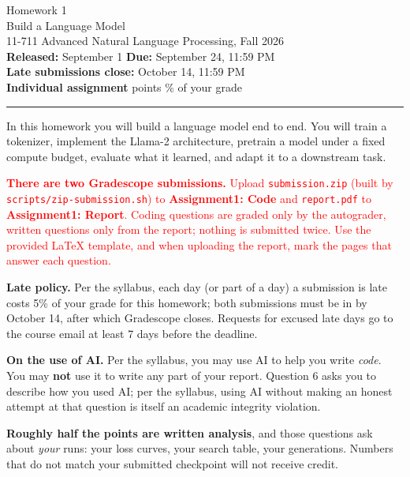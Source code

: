 \documentclass[11pt]{article}
\begin{document}
\begin{center}
  {\Huge\sffamily\color{mauve} Homework 1}\\[6pt]
  {\Large\sffamily Build a Language Model}\\[10pt]
  {\large 11-711 Advanced Natural Language Processing, Fall 2026}\\[4pt]
  \textbf{Released:} September 1 \quad\textbf{Due:} September 24, 11:59 PM\\[2pt]
  \textbf{Late submissions close:} October 14, 11:59 PM\\[2pt]
  \textbf{Individual assignment}  points \% of your grade
\end{center}

\vspace{0.8em}
\hrule
\vspace{0.8em}

\noindent In this homework you will build a language model end to end. You will train a
tokenizer, implement the Llama-2 architecture, pretrain a model under a fixed compute budget,
evaluate what it learned, and adapt it to a downstream task.

\vspace{0.6em}
\noindent\textcolor{red}{\textbf{There are two Gradescope submissions.} Upload
\texttt{submission.zip} (built by \texttt{scripts/zip-submission.sh}) to \textbf{Assignment1: Code}
and \texttt{report.pdf} to \textbf{Assignment1: Report}. Coding questions are graded only by the
autograder, written questions only from the report; nothing is submitted twice. Use the provided
LaTeX template, and when uploading the report, mark the pages that answer each question.}

\vspace{0.6em}
\noindent\textbf{Late policy.} Per the syllabus, each day (or part of a day) a submission is late
costs 5\% of your grade for this homework; both submissions must be in by October 14, after which
Gradescope closes. Requests for excused late days go to the course email at least 7 days before the
deadline.

\vspace{0.6em}
\noindent\textbf{On the use of AI.} Per the syllabus, you may use AI to help you write \emph{code}.
You may \textbf{not} use it to write any part of your report. Question 6 asks you to describe how
you used AI; per the syllabus, using AI without making an honest
attempt at that question is itself an academic integrity violation.

\vspace{0.6em}
\noindent\textbf{Roughly half the points are written analysis}, and those questions ask about
\emph{your} runs: your loss curves, your search table, your generations. Numbers that do not
match your submitted checkpoint will not receive credit.
\end{document}
